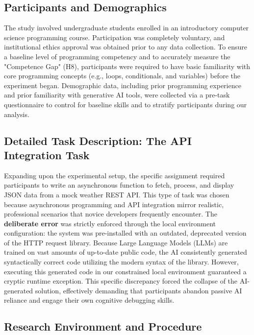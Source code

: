 \documentclass[../main.tex]{subfiles}
\begin{document}
\subsection{Participants and Demographics}

The study involved undergraduate students enrolled in an introductory computer science programming course. 
Participation was completely voluntary, and institutional ethics approval was obtained prior to any data collection. 
To ensure a baseline level of programming competency and to accurately measure the "Competence Gap" (H8), participants were required to have basic familiarity with core programming concepts (e.g., loops, conditionals, and variables) before the experiment began. 
Demographic data, including prior programming experience and prior familiarity with generative AI tools, were collected via a pre-task questionnaire to control for baseline skills and to stratify participants during our analysis.
\cite{prather2024widening} \cite{kusper2025we} 

\subsection{Detailed Task Description: The API Integration Task}

Expanding upon the experimental setup, the specific assignment required participants to write an asynchronous function to fetch, process, and display JSON data from a mock weather REST API. This type of task was chosen because asynchronous programming and API integration mirror realistic, professional scenarios that novice developers frequently encounter. 
The \textbf{deliberate error} was strictly enforced through the local environment configuration: the system 
was pre-installed with an outdated, deprecated version of the HTTP request library. Because Large Language 
Models (LLMs) are trained on vast amounts of up-to-date public code, the AI consistently generated 
syntactically correct code utilizing the modern syntax of the library. However, executing this generated 
code in our constrained local environment guaranteed a cryptic runtime exception. This specific discrepancy 
forced the collapse of the AI-generated solution, effectively demanding that participants abandon passive AI 
reliance and engage their own cognitive debugging skills.
\cite{shen2026how}

\subsection{Research Environment and Procedure}
\end{document}
